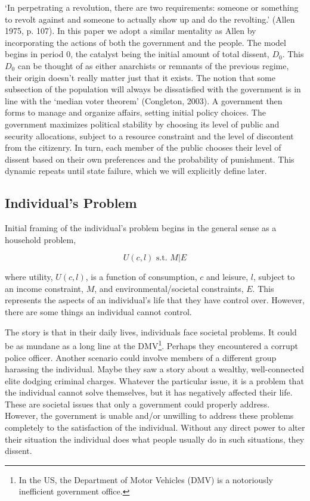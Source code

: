 \documentclass[12pt]{article}
\begin{document}
\begin{spacing}{1.5}
`In perpetrating a revolution, there are two requirements: someone or something to revolt against and someone to actually show up and do the revolting.' (Allen 1975, p. 107). In this paper we adopt a similar mentality as Allen by incorporating the actions of both the government and the people. The model begins in period 0, the catalyst being the initial amount of total dissent, $D_0$. This $D_0$ can be thought of as either anarchists or remnants of the previous regime, their origin doesn't really matter just that it exists. The notion that some subsection of the population will always be dissatisfied with the government is in line with the `median voter theorem' (Congleton, 2003). A government then forms to manage and organize affairs, setting initial policy choices. The government maximizes political stability by choosing its level of public and security allocations, subject to a resource constraint and the level of discontent from the citizenry. In turn, each member of the public chooses their level of dissent based on their own preferences and the probability of punishment. This dynamic repeats until state failure, which we will explicitly define later. 
 
\subsection{Individual's Problem}

Initial framing of the individual's problem  begins in the general sense as a household problem, 

\begin{equation}
	U(c,l) \text{ s.t. } M|E
\end{equation}

\noindent where utility, $U(c,l)$, is a function of consumption, $c$ and leisure, $l$, subject to an income constraint, $M$, and environmental/societal constraints, $E$. This represents the aspects of an individual's life that they have control over. However, there are some things an individual cannot control.  

The story is that in their daily lives, individuals face societal problems. It could be as mundane as a long line at the DMV\footnote{In the US, the Department of Motor Vehicles (DMV) is a notoriously inefficient government office.}. Perhaps they encountered a corrupt police officer. Another scenario could involve members of a different group harassing the individual. Maybe they saw a story about a wealthy, well-connected elite dodging criminal charges. Whatever the particular issue, it is a problem that the individual cannot solve themselves, but it has negatively affected their life. These are societal issues that only a government could properly address. However, the government is unable and/or unwilling to address these problems completely to the satisfaction of the individual. Without any direct power to alter their situation the individual does what people usually do in such situations, they dissent. 


\end{spacing}
\end{document}
